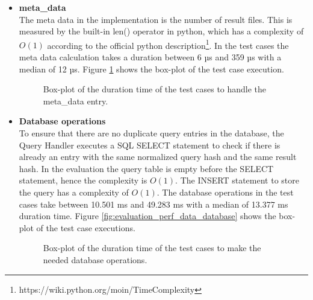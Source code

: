 \documentclass[draft,final]{vutinfth} %
\begin{document}
\begin{itemize}
	\item \textbf{meta\_data} \\
	The meta data in the implementation is the number of result files. This is measured by the built-in len() operator in python, which has a complexity of $O(1)$ according to the official python description\footnote{https://wiki.python.org/moin/TimeComplexity}. In the test cases the meta data calculation takes a duration between 6 µs and 359 µs with a median of 12 µs. Figure \ref{fig:evaluation_perf_meta_data} shows the box-plot of the test case execution.
	\begin{figure}[!h]
		\centering
		\caption{Box-plot of the duration time of the test cases to handle the meta\_data entry.}
		\label{fig:evaluation_perf_meta_data}	
	\end{figure}
	\item \textbf{Database operations} \\
	To ensure that there are no duplicate query entries in the database, the Query Handler executes a SQL SELECT statement to check if there is already an entry with the same normalized query hash and the same result hash. In the evaluation the query table is empty before the SELECT statement, hence the complexity is $O(1)$. The INSERT statement to store the query has a complexity of $O(1)$. The database operations in the test cases take between 10.501 ms and 49.283 ms with a median of 13.377 ms duration time. Figure \ref{fig:evaluation_perf_data_database} shows the box-plot of the test case executions.  
	\begin{figure}[!h]
		\centering
		\caption{Box-plot of the duration time of the test cases to make the needed database operations.}

\end{figure}
\end{itemize}
\end{document}
